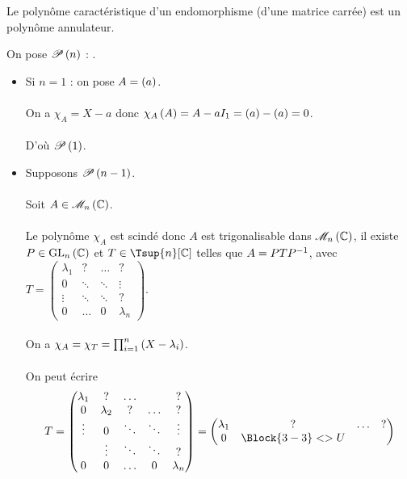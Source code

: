 \begin{theo}
Le polynôme caractéristique d'un endomorphisme (d'une matrice carrée) est un polynôme annulateur.
\end{theo}

\begin{dem}
On pose \(\P{n}\) : .

\begin{itemize}
    \item Si \(n=1\) : on pose \(A=\paren{a}\). \\\\ On a \(\chi_A=X-a\) donc \(\chi_A\paren{A}=A-aI_1=\paren{a}-\paren{a}=0\). \\\\ D'où \(\P{1}\). \\
    \item Supposons \(\P{n-1}\). \\\\ Soit \(A\in\M{n}[\C]\). \\\\ Le polynôme \(\chi_A\) est scindé donc \(A\) est trigonalisable dans \(\M{n}[\C]\), \ie il existe \(P\in\GL{n}[\C]\) et \(T\in\Tsup{n}[\C]\) telles que \(A=PTP\inv\), avec \(T=\begin{pmatrix}
        \lambda_1 & ? & \dots & ? \\
        0 & \ddots & \ddots & \vdots \\
        \vdots & \ddots & \ddots & ? \\
        0 & \dots & 0 & \lambda_n
    \end{pmatrix}\). \\\\ On a \(\chi_A=\chi_T=\prod_{i=1}^n\paren{X-\lambda_i}\). \\\\ On peut écrire \[T=\begin{pmatrix}
        \lambda_1 & ? & \dots & & ? \\
        0 & \lambda_2 & ? & \dots & ? \\
        \vdots & 0 & \ddots & \ddots & \vdots \\
        & \vdots & \ddots & \ddots & ? \\
        0 & 0 & \dots & 0 & \lambda_n
    \end{pmatrix}=\begin{pmatrix}
        \lambda_1 & ? & \dots & ? \\
        0 & \Block{3-3}<\Large>{U} & & \\

\end{pmatrix}\]
\end{itemize}
\end{dem}
